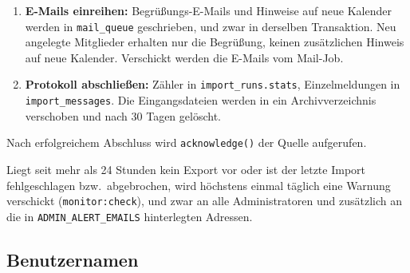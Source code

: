 \documentclass[a4paper,fontsize=10pt]{scrartcl}
\newcommand{\code}[1]{\texttt{#1}}
\begin{document}
\begin{enumerate}
\begin{itemize}
            Adresse $\rightarrow$ \code{status = active}.
      \item Mitglieder, die nicht mehr im Export sind, löschen.
      \item \code{memberships} ersetzen und \code{user\_calendars} neu
            berechnen. Neue Zuordnungen erhalten \code{since = now()}.
      \item Termine abgleichen: neu, geändert (über \code{content\_hash}),
            entfernt. Für jede Änderung \code{ics} und \code{etag} neu
            erzeugen, \code{sequence\_no} erhöhen, einen Eintrag in
            \code{calendar\_changes} schreiben und \code{sync\_token} des
            Kalenders erhöhen.
      \item Termine, deren \code{bereich} keinem Kalender zugeordnet ist,
            als Warnung \code{event\_unmapped} protokollieren.
    \end{itemize}
  \item \textbf{E-Mails einreihen:} Begrüßungs-E-Mails und Hinweise auf neue
        Kalender werden in \code{mail\_queue} geschrieben, und zwar in
        derselben Transaktion. Neu angelegte Mitglieder erhalten nur die
        Begrüßung, keinen zusätzlichen Hinweis auf neue Kalender. Verschickt
        werden die E-Mails vom Mail-Job.
  \item \textbf{Protokoll abschließen:} Zähler in \code{import\_runs.stats},
        Einzelmeldungen in \code{import\_messages}. Die Eingangsdateien
        werden in ein Archivverzeichnis verschoben und nach 30 Tagen
        gelöscht.
\end{enumerate}

Nach erfolgreichem Abschluss wird \code{acknowledge()} der Quelle aufgerufen.

Liegt seit mehr als 24 Stunden kein Export vor oder ist der letzte
Import fehlgeschlagen bzw.\ abgebrochen, wird höchstens einmal täglich eine
Warnung verschickt (\code{monitor:check}), und zwar an alle Administratoren
und zusätzlich an die in \code{ADMIN\_ALERT\_EMAILS} hinterlegten Adressen.

\subsection{Benutzernamen}\label{sec:benutzernamen}
\end{document}
